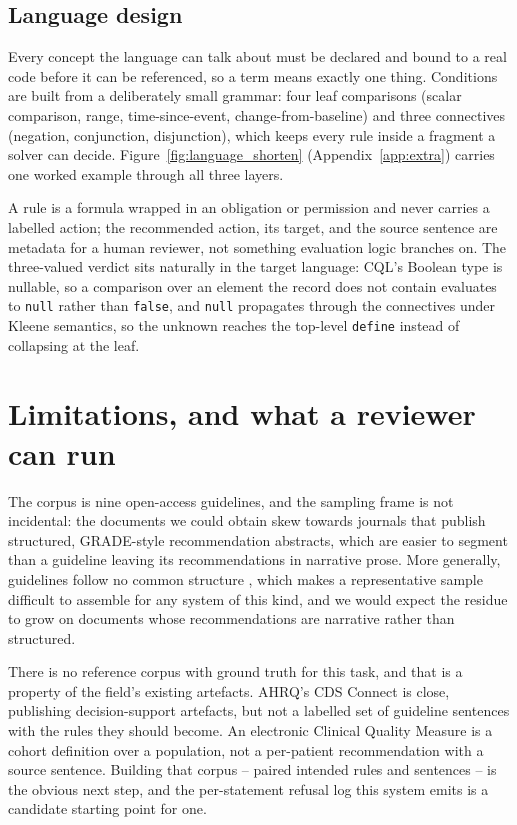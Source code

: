 \documentclass{article}
\newcommand{\budget}[1]{\marginpar{\scriptsize\color{gray}#1}}
\newcommand{\budget}[1]{}
\begin{document}
\subsection{Language design}

Every concept the language can talk about must be declared and bound to a real code before it can be referenced, so a term means exactly one thing. Conditions are built from a deliberately small grammar: four leaf comparisons (scalar comparison, range, time-since-event, change-from-baseline) and three connectives (negation, conjunction, disjunction), which keeps every rule inside a fragment a solver can decide. Figure~\ref{fig:language_shorten} (Appendix~\ref{app:extra}) carries one worked example through all three layers.

A rule is a formula wrapped in an obligation or permission and never carries a labelled action; the recommended action, its target, and the source sentence are metadata for a human reviewer, not something evaluation logic branches on. The three-valued verdict sits naturally in the target language: CQL's Boolean type is nullable, so a comparison over an element the record does not contain evaluates to \texttt{null} rather than \texttt{false}, and \texttt{null} propagates through the connectives under Kleene semantics, so the unknown reaches the top-level \texttt{define} instead of collapsing at the leaf.




\section{Limitations, and what a reviewer can run}
\label{sec:limits}
\budget{0.25 pp --- flat, no hedging}
The corpus is nine open-access guidelines, and the sampling frame is not incidental: the documents we could obtain skew towards journals that publish structured, GRADE-style \citep{grade} recommendation abstracts, which are easier to segment than a guideline leaving its recommendations in narrative prose. More generally, guidelines follow no common structure \citep{peleg}, which makes a representative sample difficult to assemble for any system of this kind, and we would expect the residue to grow on documents whose recommendations are narrative rather than structured.

There is no reference corpus with ground truth for this task, and that is a property of the field's existing artefacts. AHRQ's CDS Connect \citep{cdsconnect} is close, publishing decision-support artefacts, but not a labelled set of guideline sentences with the rules they should become. An electronic Clinical Quality Measure \citep{cql} is a cohort definition over a population, not a per-patient recommendation with a source sentence. Building that corpus -- paired intended rules and sentences -- is the obvious next step, and the per-statement refusal log this system emits is a candidate starting point for one.
\end{document}
